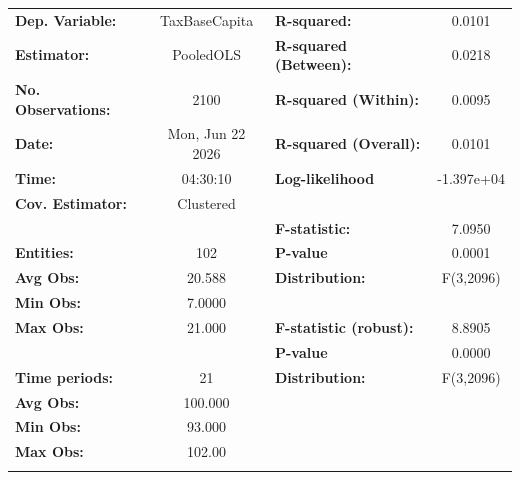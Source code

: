 \begin{center}
\begin{tabular}{lclc}
\toprule
\textbf{Dep. Variable:}          &   TaxBaseCapita    & \textbf{  R-squared:         }   &      0.0101      \\
\textbf{Estimator:}              &     PooledOLS      & \textbf{  R-squared (Between):}  &      0.0218      \\
\textbf{No. Observations:}       &        2100        & \textbf{  R-squared (Within):}   &      0.0095      \\
\textbf{Date:}                   &  Mon, Jun 22 2026  & \textbf{  R-squared (Overall):}  &      0.0101      \\
\textbf{Time:}                   &      04:30:10      & \textbf{  Log-likelihood     }   &    -1.397e+04    \\
\textbf{Cov. Estimator:}         &     Clustered      & \textbf{                     }   &                  \\
\textbf{}                        &                    & \textbf{  F-statistic:       }   &      7.0950      \\
\textbf{Entities:}               &        102         & \textbf{  P-value            }   &      0.0001      \\
\textbf{Avg Obs:}                &       20.588       & \textbf{  Distribution:      }   &    F(3,2096)     \\
\textbf{Min Obs:}                &       7.0000       & \textbf{                     }   &                  \\
\textbf{Max Obs:}                &       21.000       & \textbf{  F-statistic (robust):} &      8.8905      \\
\textbf{}                        &                    & \textbf{  P-value            }   &      0.0000      \\
\textbf{Time periods:}           &         21         & \textbf{  Distribution:      }   &    F(3,2096)     \\
\textbf{Avg Obs:}                &      100.000       & \textbf{                     }   &                  \\
\textbf{Min Obs:}                &       93.000       & \textbf{                     }   &                  \\
\textbf{Max Obs:}                &       102.00       & \textbf{                     }   &                  \\
\textbf{}                        &                    & \textbf{                     }   &                  \\

\end{tabular}
\end{center}

